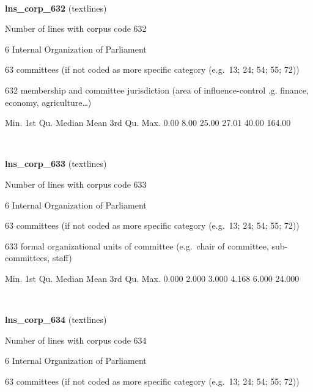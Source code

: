 \documentclass[]{article}
\newenvironment{Shaded}{\begin{snugshade}}{\end{snugshade}}
\newcommand{\FloatTok}[1]{\textcolor[rgb]{0.00,0.00,0.81}{{#1}}}
\newcommand{\NormalTok}[1]{{#1}}
\begin{document}
~

\vspace{1em}

\textbf{lns\_corp\_632} (textlines)

Number of lines with corpus code 632

6 Internal Organization of Parliament

63 committees (if not coded as more specific category (e.g.~13; 24; 54;
55; 72))

632 membership and committee jurisdiction (area of influence-control .g.
finance, economy, agriculture\ldots{})

\begin{Shaded}
\begin{Highlighting}[]
   \NormalTok{Min. 1st Qu.  Median    Mean 3rd Qu.    Max. }
   \FloatTok{0.00}    \FloatTok{8.00}   \FloatTok{25.00}   \FloatTok{27.01}   \FloatTok{40.00}  \FloatTok{164.00} 
\end{Highlighting}
\end{Shaded}

~

\vspace{1em}

\textbf{lns\_corp\_633} (textlines)

Number of lines with corpus code 633

6 Internal Organization of Parliament

63 committees (if not coded as more specific category (e.g.~13; 24; 54;
55; 72))

633 formal organizational units of committee (e.g.~chair of committee,
sub-committees, staff)

\begin{Shaded}
\begin{Highlighting}[]
   \NormalTok{Min. 1st Qu.  Median    Mean 3rd Qu.    Max. }
  \FloatTok{0.000}   \FloatTok{2.000}   \FloatTok{3.000}   \FloatTok{4.168}   \FloatTok{6.000}  \FloatTok{24.000} 
\end{Highlighting}
\end{Shaded}

~

\vspace{1em}

\textbf{lns\_corp\_634} (textlines)

Number of lines with corpus code 634

6 Internal Organization of Parliament

63 committees (if not coded as more specific category (e.g.~13; 24; 54;
55; 72))
\end{document}
